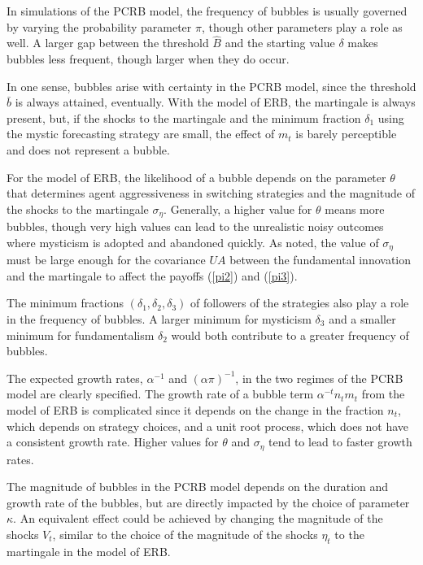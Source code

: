 \documentclass[12pt]{article}
\begin{document}
In simulations of the PCRB model, the frequency of bubbles is usually governed by varying the probability parameter $\pi$, though other parameters play a role as well. A larger gap between the threshold $\widehat{B}$ and the starting value $\delta$ makes bubbles less frequent, though larger when they do occur. 

In one sense, bubbles arise with certainty in the PCRB model, since the threshold $\bar{b}$ is always attained, eventually. With the model of ERB, the martingale is always present, but, if the shocks to the martingale and the minimum fraction $\delta_{1}$ using the mystic forecasting strategy are small, the effect of $m_{t}$ is barely perceptible and does not represent a bubble.

For the model of ERB, the likelihood of a bubble depends on the parameter $\theta$ that determines agent aggressiveness in switching strategies and the magnitude of the shocks to the martingale $\sigma_{\eta}$. Generally, a higher value for $\theta$ means more bubbles, though very high values can lead to the unrealistic noisy outcomes where mysticism is adopted and abandoned quickly. As noted, the value of $\sigma_{\eta}$ must be large enough for the covariance $UA$ between the fundamental innovation and the martingale to affect the payoffs (\ref{pi2}) and (\ref{pi3}).

The minimum fractions $(\delta_{1},\delta_{2},\delta_{3})$ of followers of the strategies also play a role in the frequency of bubbles. A larger minimum for mysticism $\delta_{3}$ and a smaller minimum for fundamentalism $\delta_{2}$ would both contribute to a greater frequency of bubbles.

The expected growth rates, $\alpha^{-1}$ and $(\alpha\pi)^{-1}$, in the two regimes of the PCRB model are clearly specified. The growth rate of a bubble term $\alpha^{-t} n_{t} m_{t}$ from the model of ERB is complicated since it depends on the change in the fraction $n_{t}$, which depends on strategy choices, and a unit root process, which does not have a consistent growth rate. Higher values for $\theta$ and $\sigma_{\eta}$ tend to lead to faster growth rates.

The magnitude of bubbles in the PCRB model depends on the duration and growth rate of the bubbles, but are directly impacted by the choice of parameter $\kappa$. An equivalent effect could be achieved by changing the magnitude of the shocks $V_{t}$, similar to the choice of the magnitude of the shocks $\eta_{t}$ to the martingale in the model of ERB.
\end{document}
